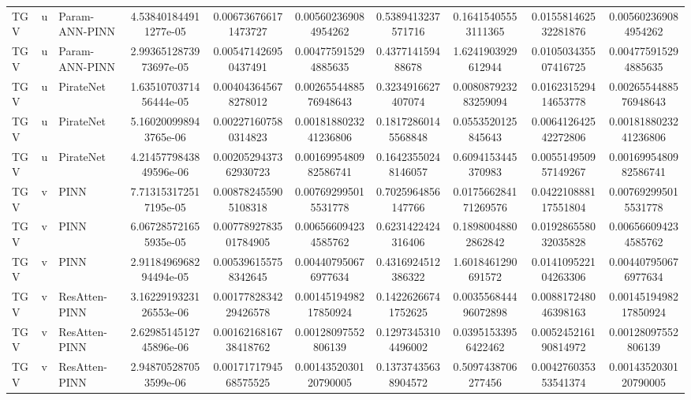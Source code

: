 \begin{landscape}
\begin{longtable}{lllccccccc}
 TGV &     u & Param-ANN-PINN &  4.538401844911277e-05 &   0.006736766171473727 &   0.005602369084954262 &   0.5389413237571716 &   0.16415405553111365 &  0.015581462532281876 &   0.005602369084954262 \\
 TGV &     u & Param-ANN-PINN & 2.9936512873973697e-05 &   0.005471426950437491 &   0.004775915294885635 &    0.437714159488678 &    1.6241903929612944 &  0.010503435507416725 &   0.004775915294885635 \\
 TGV &     u &      PirateNet & 1.6351070371456444e-05 &   0.004043645678278012 &  0.0026554488576948643 &   0.3234916627407074 &  0.008087923283259094 &  0.016231529414653778 &  0.0026554488576948643 \\
 TGV &     u &      PirateNet &  5.160200998943765e-06 &   0.002271607580314823 &  0.0018188023241236806 &  0.18172860145568848 &    0.0553520125845643 &  0.006412642542272806 &  0.0018188023241236806 \\
 TGV &     u &      PirateNet & 4.2145779843849596e-06 &  0.0020529437362930723 &  0.0016995480982586741 &  0.16423550248146057 &    0.6094153445370983 &  0.005514950957149267 &  0.0016995480982586741 \\
 TGV &     v &           PINN &  7.713153172517195e-05 &   0.008782455905108318 &   0.007692995015531778 &   0.7025964856147766 &  0.017566284171269576 &  0.042210888117551804 &   0.007692995015531778 \\
 TGV &     v &           PINN &  6.067285721655935e-05 &  0.0077892783501784905 &   0.006566094234585762 &   0.6231422424316406 &   0.18980048802862842 &  0.019286558032035828 &   0.006566094234585762 \\
 TGV &     v &           PINN & 2.9118496968294494e-05 &   0.005396155758342645 &   0.004407950676977634 &   0.4316924512386322 &    1.6018461290691572 &  0.014109522104263306 &   0.004407950676977634 \\
 TGV &     v &  ResAtten-PINN & 3.1622919323126553e-06 &  0.0017782834229426578 &  0.0014519498217850924 &  0.14226266741752625 &  0.003556844496072898 &  0.008817248046398163 &  0.0014519498217850924 \\
 TGV &     v &  ResAtten-PINN & 2.6298514512745896e-06 &  0.0016216816738418762 &    0.00128097552806139 &  0.12973453104496002 &   0.03951533956422462 &  0.005245216190814972 &    0.00128097552806139 \\
 TGV &     v &  ResAtten-PINN &  2.948705287053599e-06 &  0.0017171794568575525 &  0.0014352030120790005 &  0.13737435638904572 &    0.5097438706277456 &  0.004276035353541374 &  0.0014352030120790005 \\

\end{longtable}
\end{landscape}
